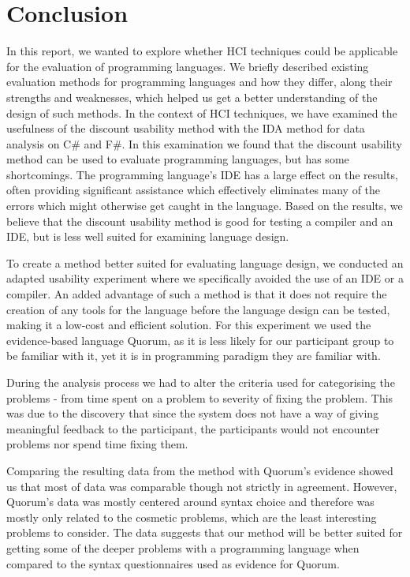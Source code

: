 \chapter{Conclusion}
\label{chap:conclusion}
In this report, we wanted to explore whether HCI techniques could be applicable for the evaluation of programming languages.
We briefly described existing evaluation methods for programming languages and how they differ, along their strengths and weaknesses, which helped us get a better understanding of the design of such methods.
In the context of HCI techniques, we have examined the usefulness of the discount usability method with the IDA method for data analysis on C\# and F\#.
In this examination we found that the discount usability method can be used to evaluate programming languages, but has some shortcomings.
The programming language’s IDE has a large effect on the results, often providing significant assistance which effectively eliminates many of the errors which might otherwise get caught in the language.
Based on the results, we believe that the discount usability method is good for testing a compiler and an IDE, but is less well suited for examining language design.

To create a method better suited for evaluating language design, we conducted an adapted usability experiment where we specifically avoided the use of an IDE or a compiler.
An added advantage of such a method is that it does not require the creation of any tools for the language before the language design can be tested, making it a low-cost and efficient solution. 
For this experiment we used the evidence-based language Quorum, as it is less likely for our participant group to be familiar with it, yet it is in programming paradigm they are familiar with. 

During the analysis process we had to alter the criteria used for categorising the problems - from time spent on a problem to severity of fixing the problem.
This was due to the discovery that since the system does not have a way of giving meaningful feedback to the participant, the participants would not encounter problems nor spend time fixing them.

Comparing the resulting data from the method with Quorum’s evidence showed us that most of data was comparable though not strictly in agreement.
However, Quorum’s data was mostly centered around syntax choice and therefore was mostly only related to the cosmetic problems, which are the least interesting problems to consider.
The data suggests that our method will be better suited for getting some of the deeper problems with a programming language when compared to the syntax questionnaires used as evidence for Quorum.

